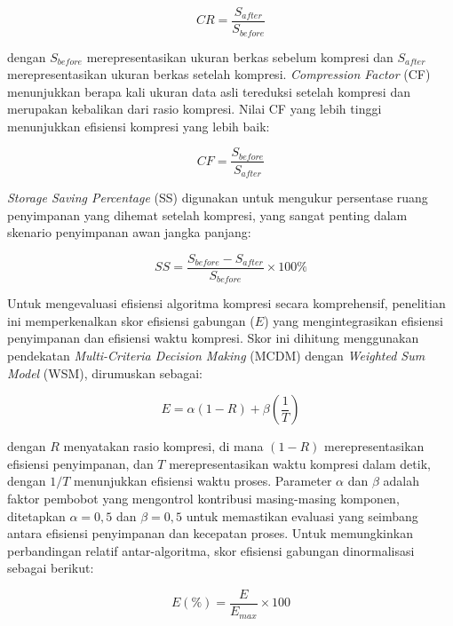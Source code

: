\documentclass{iaesarticle}
\begin{document}
\begin{equation}
CR = \frac{S_{after}}{S_{before}}
\end{equation}

dengan $S_{before}$ merepresentasikan ukuran berkas sebelum kompresi dan $S_{after}$ merepresentasikan ukuran berkas setelah kompresi. \textit{Compression Factor} (CF) menunjukkan berapa kali ukuran data asli tereduksi setelah kompresi dan merupakan kebalikan dari rasio kompresi. Nilai CF yang lebih tinggi menunjukkan efisiensi kompresi yang lebih baik:

\begin{equation}
CF = \frac{S_{before}}{S_{after}}
\end{equation}

\textit{Storage Saving Percentage} (SS) digunakan untuk mengukur persentase ruang penyimpanan yang dihemat setelah kompresi, yang sangat penting dalam skenario penyimpanan awan jangka panjang:

\begin{equation}
SS = \frac{S_{before} - S_{after}}{S_{before}} \times 100\%
\end{equation}

Untuk mengevaluasi efisiensi algoritma kompresi secara komprehensif, penelitian ini memperkenalkan skor efisiensi gabungan ($E$) yang mengintegrasikan efisiensi penyimpanan dan efisiensi waktu kompresi. Skor ini dihitung menggunakan pendekatan \textit{Multi-Criteria Decision Making} (MCDM) dengan \textit{Weighted Sum Model} (WSM), dirumuskan sebagai:

\begin{equation}
E = \alpha (1 - R) + \beta \left( \frac{1}{T} \right)
\end{equation}

dengan $R$ menyatakan rasio kompresi, di mana $(1-R)$ merepresentasikan efisiensi penyimpanan, dan $T$ merepresentasikan waktu kompresi dalam detik, dengan $1/T$ menunjukkan efisiensi waktu proses. Parameter $\alpha$ dan $\beta$ adalah faktor pembobot yang mengontrol kontribusi masing-masing komponen, ditetapkan $\alpha = 0{,}5$ dan $\beta = 0{,}5$ untuk memastikan evaluasi yang seimbang antara efisiensi penyimpanan dan kecepatan proses. Untuk memungkinkan perbandingan relatif antar-algoritma, skor efisiensi gabungan dinormalisasi sebagai berikut:

\begin{equation}
E(\%) = \frac{E}{E_{max}} \times 100
\end{equation}
\end{document}
